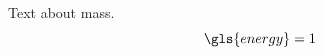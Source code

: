 \documentclass{article}
\begin{document}
Text about \gls{mass}.
\begin{equation}
\gls{energy} = 1
\end{equation}
\printnoidxglossaries
\end{document}
